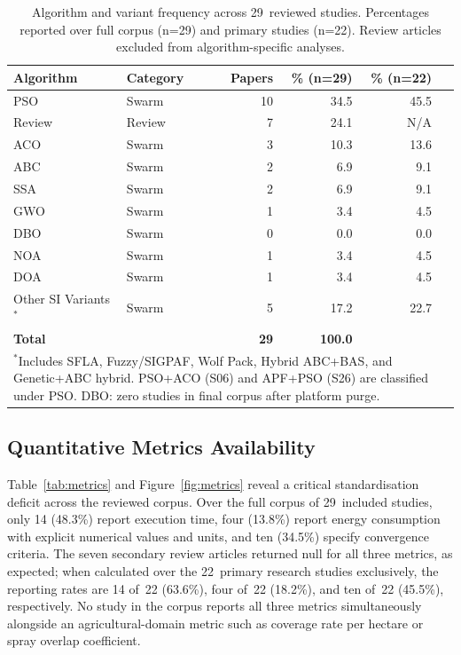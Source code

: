\documentclass[review,3p]{elsarticle}
\begin{document}
\begin{table}[htbp]
\centering
\caption{Algorithm and variant frequency across 29~reviewed studies. Percentages
reported over full corpus (n=29) and primary studies (n=22). Review articles
excluded from algorithm-specific analyses.}
\label{tab:algorithms}
\begin{tabular}{llrrrr}
\toprule
\textbf{Algorithm} & \textbf{Category} & \textbf{Papers} & \textbf{\% (n=29)} & \textbf{\% (n=22)} \\
\midrule
PSO          & Swarm  & 10 & 34.5 & 45.5 \\
Review       & Review &  7 & 24.1 & N/A  \\
ACO          & Swarm  &  3 & 10.3 & 13.6 \\
ABC          & Swarm  &  2 &  6.9 &  9.1 \\
SSA          & Swarm  &  2 &  6.9 &  9.1 \\
GWO          & Swarm  &  1 &  3.4 &  4.5 \\
DBO          & Swarm  &  0 &  0.0 &  0.0 \\
NOA          & Swarm  &  1 &  3.4 &  4.5 \\
DOA          & Swarm  &  1 &  3.4 &  4.5 \\
Other SI Variants$^*$ & Swarm & 5 & 17.2 & 22.7 \\
\midrule
\textbf{Total} & & \textbf{29} & \textbf{100.0} & \\
\bottomrule
\multicolumn{6}{p{0.92\textwidth}}{\scriptsize$^*$Includes SFLA, Fuzzy/SIGPAF, Wolf Pack,
Hybrid ABC+BAS, and Genetic+ABC hybrid. PSO+ACO (S06) and APF+PSO (S26) are classified
under PSO. DBO: zero studies in final corpus after platform purge.}
\end{tabular}
\end{table}

\subsection{Quantitative Metrics Availability}

Table~\ref{tab:metrics} and Figure~\ref{fig:metrics} reveal a critical
standardisation deficit across the reviewed corpus. Over the full corpus of
29~included studies, only 14 (48.3\%) report execution time, four (13.8\%)
report energy consumption with explicit numerical values and units, and ten
(34.5\%) specify convergence criteria. The seven secondary review articles
returned null for all three metrics, as expected; when calculated over the
22~primary research studies exclusively, the reporting rates are 14 of~22
(63.6\%), four of~22 (18.2\%), and ten of~22 (45.5\%), respectively. No study
in the corpus reports all three metrics simultaneously alongside an
agricultural-domain metric such as coverage rate per hectare or spray overlap
coefficient.
\end{document}
